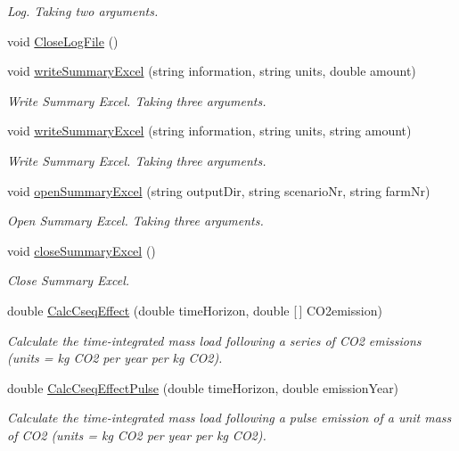 \begin{DoxyCompactItemize}
\begin{DoxyCompactList}\small\item\em Log. Taking two arguments. \end{DoxyCompactList}\item 
void \mbox{\hyperlink{class_global_vars_ab3cfc89c4d656803191de79796e57793}{Close\+Log\+File}} ()
\item 
void \mbox{\hyperlink{class_global_vars_a99677a9c868e5b5b83e114e3f8f63100}{write\+Summary\+Excel}} (string information, string units, double amount)
\begin{DoxyCompactList}\small\item\em Write Summary Excel. Taking three arguments. \end{DoxyCompactList}\item 
void \mbox{\hyperlink{class_global_vars_a123a48cd4e07ce1e01555f150d093044}{write\+Summary\+Excel}} (string information, string units, string amount)
\begin{DoxyCompactList}\small\item\em Write Summary Excel. Taking three arguments. \end{DoxyCompactList}\item 
void \mbox{\hyperlink{class_global_vars_ae0867ba6d6225f173f8394a20925cbdf}{open\+Summary\+Excel}} (string output\+Dir, string scenario\+Nr, string farm\+Nr)
\begin{DoxyCompactList}\small\item\em Open Summary Excel. Taking three arguments. \end{DoxyCompactList}\item 
\mbox{\label{class_global_vars_aceec9231298720952c74d5694f19265e}} 
void \mbox{\hyperlink{class_global_vars_aceec9231298720952c74d5694f19265e}{close\+Summary\+Excel}} ()
\begin{DoxyCompactList}\small\item\em Close Summary Excel. \end{DoxyCompactList}\item 
double \mbox{\hyperlink{class_global_vars_a4ff00f80fd4199c713d481bae6213d96}{Calc\+Cseq\+Effect}} (double time\+Horizon, double \mbox{[}$\,$\mbox{]} C\+O2emission)
\begin{DoxyCompactList}\small\item\em Calculate the time-\/integrated mass load following a series of C\+O2 emissions (units = kg C\+O2 per year per kg C\+O2). \end{DoxyCompactList}\item 
double \mbox{\hyperlink{class_global_vars_a04a94dd0bc66a17669168de6a5dee129}{Calc\+Cseq\+Effect\+Pulse}} (double time\+Horizon, double emission\+Year)
\begin{DoxyCompactList}\small\item\em Calculate the time-\/integrated mass load following a pulse emission of a unit mass of C\+O2 (units = kg C\+O2 per year per kg C\+O2). \end{DoxyCompactList}\end{DoxyCompactItemize}
